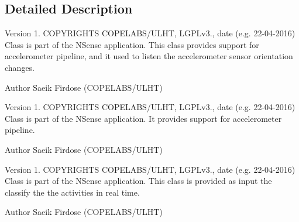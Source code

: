 \subsection{Detailed Description}
\begin{DoxyVersion}{Version}
1. C\-O\-P\-Y\-R\-I\-G\-H\-T\-S C\-O\-P\-E\-L\-A\-B\-S/\-U\-L\-H\-T, L\-G\-P\-Lv3., date (e.\-g. 22-\/04-\/2016) Class is part of the N\-Sense application. This class provides support for accelerometer pipeline, and it used to listen the accelerometer sensor orientation changes. 
\end{DoxyVersion}
\begin{DoxyAuthor}{Author}
Saeik Firdose (C\-O\-P\-E\-L\-A\-B\-S/\-U\-L\-H\-T)
\end{DoxyAuthor}
\begin{DoxyVersion}{Version}
1. C\-O\-P\-Y\-R\-I\-G\-H\-T\-S C\-O\-P\-E\-L\-A\-B\-S/\-U\-L\-H\-T, L\-G\-P\-Lv3., date (e.\-g. 22-\/04-\/2016) Class is part of the N\-Sense application. It provides support for accelerometer pipeline. 
\end{DoxyVersion}
\begin{DoxyAuthor}{Author}
Saeik Firdose (C\-O\-P\-E\-L\-A\-B\-S/\-U\-L\-H\-T)
\end{DoxyAuthor}
\begin{DoxyVersion}{Version}
1. C\-O\-P\-Y\-R\-I\-G\-H\-T\-S C\-O\-P\-E\-L\-A\-B\-S/\-U\-L\-H\-T, L\-G\-P\-Lv3., date (e.\-g. 22-\/04-\/2016) Class is part of the N\-Sense application. This class is provided as input the classify the the activities in real time. 
\end{DoxyVersion}
\begin{DoxyAuthor}{Author}
Saeik Firdose (C\-O\-P\-E\-L\-A\-B\-S/\-U\-L\-H\-T) 
\end{DoxyAuthor}
